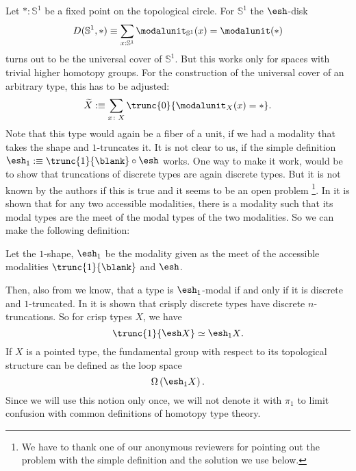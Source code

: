 \documentclass{msc}
\newcommand{\shape}{\ensuremath{\mathord{\raisebox{0.5pt}{\text{\rm\esh}}}}}
\newcommand{\bS}{\mathbb S}
\begin{document}
Let $\ast:\bS^1$ be a fixed point on the topological circle.
For $\bS^{1}$ the $\shape$-disk
\[ D (\bS^1,\ast) \equiv \sum_{x:\bS^{1}}\modalunit_{\bS^{1}}(x)=\modalunit(\ast) \]
turns out to be the universal cover of $\bS^{1}$.
But this works only for spaces with trivial higher homotopy groups. 
For the construction of the universal cover of an arbitrary type, this has to be adjusted:
\[ \widetilde{X}:\equiv \sum_{x\colon X} \trunc{0}{\modalunit_X(x)=\ast}. \]
Note that this type would again be a fiber of a unit, if we had a modality that takes the shape and $1$-truncates it.
It is not clear to us, if the simple definition $\shape_1:\equiv\trunc{1}{\blank}\circ\shape$ works.
One way to make it work, would be to show that truncations of discrete types are again discrete types.
But it is not known by the authors if this is true and it seems to be an open problem
\footnote{We have to thank one of our anonymous reviewers for pointing out the problem with the simple definition and the solution we use below.}.
In \cite[Theorem 3.28]{RijkeSpittersShulman} it is shown that for any two accessible modalities,
there is a modality such that its modal types are the meet of the modal types of the two modalities.
So we can make the following definition:
\begin{defn}
Let the $1$-shape, $\shape_1$ be the modality given as the meet of the accessible modalities $\trunc{1}{\blank}$ and $\shape$.
\end{defn}
Then, also from \cite{RijkeSpittersShulman} we know, that a type is $\shape_1$-modal if and only if it is discrete and $1$-truncated.
In \cite[Theorem 6.21]{ShulmanRealCohesion} it is shown that crisply discrete types have discrete $n$-truncations.
So for crisp types $X$, we have
\[ \trunc{1}{\shape X} \simeq \shape_1 X\text{.} \]
If $X$ is a pointed type, the fundamental group with respect to its topological structure can be defined as the loop space
\[ \Omega \left(\shape_1 X\right). \]
Since we will use this notion only once, we will not denote it with $\pi_1$ to limit confusion with common definitions of homotopy type theory.
\end{document}
